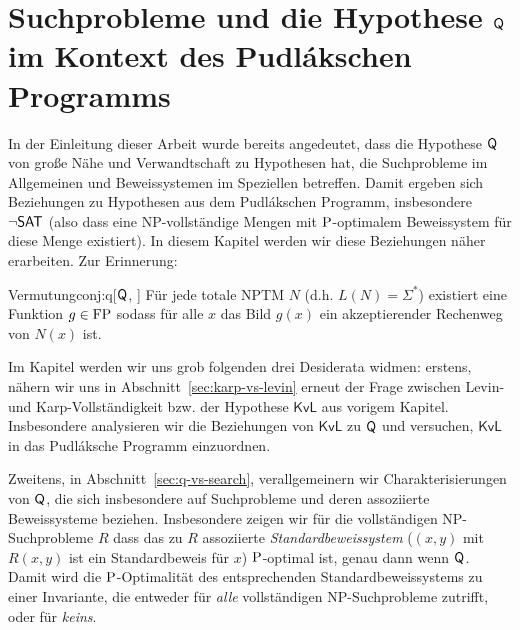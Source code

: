 \chapter{Suchprobleme und die Hypothese $\hQ$ im Kontext des Pudlákschen Programms}\label{chap:pudlak}


In der Einleitung dieser Arbeit wurde bereits angedeutet, dass die Hypothese $\hQ$ von \citeauthor{fenner_inverting_2003} große Nähe und Verwandtschaft zu Hypothesen hat, die Suchprobleme im Allgemeinen und Beweissystemen im Speziellen betreffen. Damit ergeben sich Beziehungen zu Hypothesen aus dem Pudlákschen Programm, insbesondere $\neg\hSAT$ (also dass eine NP-vollständige Mengen mit $\P$-optimalem Beweissystem für diese Menge existiert).
In diesem Kapitel werden wir diese Beziehungen näher erarbeiten. Zur Erinnerung:

\begin{reptheorem}{Vermutung}{conj:q}[$\hQ$, \cite{fenner_inverting_2003}]
    Für jede totale NPTM $N$ (d.h. $L(N)=\Sigma^*$) existiert eine Funktion $g\in\FP$ sodass für alle $x$ das Bild $g(x)$ ein akzeptierender Rechenweg von $N(x)$ ist. 
\end{reptheorem}


Im Kapitel werden wir uns grob folgenden drei Desiderata widmen: 
erstens, nähern wir uns in Abschnitt~\ref{sec:karp-vs-levin} erneut der Frage zwischen Levin- und Karp-Vollständigkeit bzw. der Hypothese $\mathsf{KvL}$ aus vorigem Kapitel. Insbesondere analysieren wir die Beziehungen von $\mathsf{KvL}$ zu $\hQ$ und versuchen, $\mathsf{KvL}$ in das Pudláksche Programm einzuordnen.

Zweitens, in Abschnitt~\ref{sec:q-vs-search}, verallgemeinern wir Charakterisierungen von $\hQ$, die sich insbesondere auf Suchprobleme und deren assoziierte Beweissysteme beziehen.
Insbesondere zeigen wir für die vollständigen NP-Suchprobleme $R$ dass das zu $R$ assoziierte \emph{Standardbeweissystem} ($(x,y)$ mit $R(x,y)$ ist ein Standardbeweis für $x$) $\P$-optimal ist, genau dann wenn $\hQ$. Damit wird die $\P$-Optimalität des entsprechenden Standardbeweissystems zu einer Invariante, die entweder für \emph{alle} vollständigen NP-Suchprobleme zutrifft, oder für \emph{keins}.



